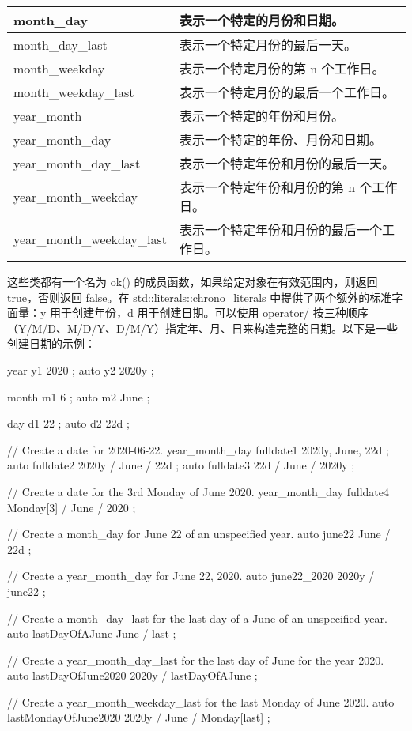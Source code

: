 \begin{longtable}{|l|l|}
month\_day &
表示一个特定的月份和日期。 \\ \hline
month\_day\_last &
表示一个特定月份的最后一天。 \\ \hline
month\_weekday &
表示一个特定月份的第 n 个工作日。 \\ \hline
month\_weekday\_last &
表示一个特定月份的最后一个工作日。 \\ \hline
year\_month &
表示一个特定的年份和月份。 \\ \hline
year\_month\_day &
表示一个特定的年份、月份和日期。 \\ \hline
year\_month\_day\_last &
表示一个特定年份和月份的最后一天。 \\ \hline
year\_month\_weekday &
表示一个特定年份和月份的第 n 个工作日。 \\ \hline
year\_month\_weekday\_last &
表示一个特定年份和月份的最后一个工作日。 \\ \hline
\end{longtable}

这些类都有一个名为 ok() 的成员函数，如果给定对象在有效范围内，则返回 true，否则返回 false。在 std::literals::chrono\_literals 中提供了两个额外的标准字面量：y 用于创建年份，d 用于创建日期。可以使用 operator/ 按三种顺序（Y/M/D、M/D/Y、D/M/Y）指定年、月、日来构造完整的日期。以下是一些创建日期的示例：

\begin{cpp}
year y1 { 2020 };
auto y2 { 2020y };

month m1 { 6 };
auto m2 { June };

day d1 { 22 };
auto d2 { 22d };

// Create a date for 2020-06-22.
year_month_day fulldate1 { 2020y, June, 22d };
auto fulldate2 { 2020y / June / 22d };
auto fulldate3 { 22d / June / 2020y };

// Create a date for the 3rd Monday of June 2020.
year_month_day fulldate4 { Monday[3] / June / 2020 };

// Create a month_day for June 22 of an unspecified year.
auto june22 { June / 22d };

// Create a year_month_day for June 22, 2020.
auto june22_2020 { 2020y / june22 };

// Create a month_day_last for the last day of a June of an unspecified year.
auto lastDayOfAJune { June / last };

// Create a year_month_day_last for the last day of June for the year 2020.
auto lastDayOfJune2020 { 2020y / lastDayOfAJune };

// Create a year_month_weekday_last for the last Monday of June 2020.
auto lastMondayOfJune2020 { 2020y / June / Monday[last] };
\end{cpp}

